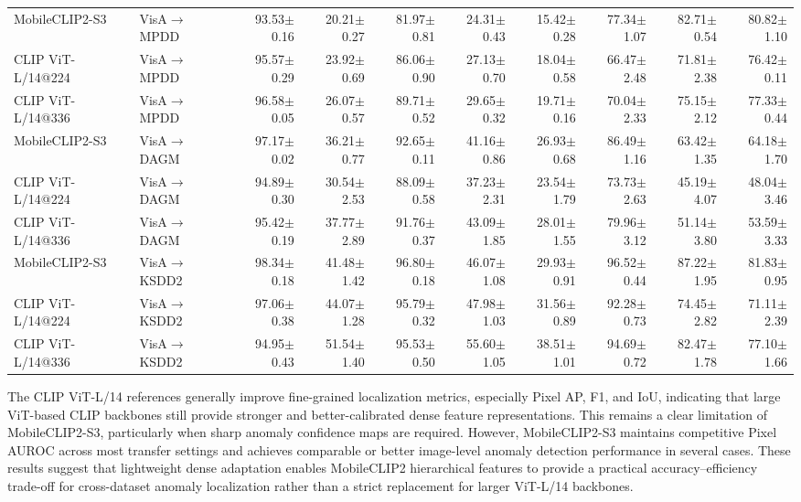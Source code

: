 \documentclass[10pt]{article}
\begin{document}
\begin{table}[htbp]
{\begin{tabular}{llrrrrrrrr}
\midrule
MobileCLIP2-S3 & VisA$\rightarrow$MPDD & 93.53$\pm$0.16 & 20.21$\pm$0.27 & 81.97$\pm$0.81 & 24.31$\pm$0.43 & 15.42$\pm$0.28 & 77.34$\pm$1.07 & 82.71$\pm$0.54 & 80.82$\pm$1.10 \\
CLIP ViT-L/14@224 & VisA$\rightarrow$MPDD & 95.57$\pm$0.29 & 23.92$\pm$0.69 & 86.06$\pm$0.90 & 27.13$\pm$0.70 & 18.04$\pm$0.58 & 66.47$\pm$2.48 & 71.81$\pm$2.38 & 76.42$\pm$0.11 \\
CLIP ViT-L/14@336 & VisA$\rightarrow$MPDD & 96.58$\pm$0.05 & 26.07$\pm$0.57 & 89.71$\pm$0.52 & 29.65$\pm$0.32 & 19.71$\pm$0.16 & 70.04$\pm$2.33 & 75.15$\pm$2.12 & 77.33$\pm$0.44 \\
\midrule
MobileCLIP2-S3 & VisA$\rightarrow$DAGM & 97.17$\pm$0.02 & 36.21$\pm$0.77 & 92.65$\pm$0.11 & 41.16$\pm$0.86 & 26.93$\pm$0.68 & 86.49$\pm$1.16 & 63.42$\pm$1.35 & 64.18$\pm$1.70 \\
CLIP ViT-L/14@224 & VisA$\rightarrow$DAGM & 94.89$\pm$0.30 & 30.54$\pm$2.53 & 88.09$\pm$0.58 & 37.23$\pm$2.31 & 23.54$\pm$1.79 & 73.73$\pm$2.63 & 45.19$\pm$4.07 & 48.04$\pm$3.46 \\
CLIP ViT-L/14@336 & VisA$\rightarrow$DAGM & 95.42$\pm$0.19 & 37.77$\pm$2.89 & 91.76$\pm$0.37 & 43.09$\pm$1.85 & 28.01$\pm$1.55 & 79.96$\pm$3.12 & 51.14$\pm$3.80 & 53.59$\pm$3.33 \\
\midrule
MobileCLIP2-S3 & VisA$\rightarrow$KSDD2 & 98.34$\pm$0.18 & 41.48$\pm$1.42 & 96.80$\pm$0.18 & 46.07$\pm$1.08 & 29.93$\pm$0.91 & 96.52$\pm$0.44 & 87.22$\pm$1.95 & 81.83$\pm$0.95 \\
CLIP ViT-L/14@224 & VisA$\rightarrow$KSDD2 & 97.06$\pm$0.38 & 44.07$\pm$1.28 & 95.79$\pm$0.32 & 47.98$\pm$1.03 & 31.56$\pm$0.89 & 92.28$\pm$0.73 & 74.45$\pm$2.82 & 71.11$\pm$2.39 \\
CLIP ViT-L/14@336 & VisA$\rightarrow$KSDD2 & 94.95$\pm$0.43 & 51.54$\pm$1.40 & 95.53$\pm$0.50 & 55.60$\pm$1.05 & 38.51$\pm$1.01 & 94.69$\pm$0.72 & 82.47$\pm$1.78 & 77.10$\pm$1.66 \\
\bottomrule
\end{tabular}
}
\end{table}

The CLIP ViT-L/14 references generally improve fine-grained localization metrics, especially Pixel AP, F1, and IoU, indicating that large ViT-based CLIP backbones still provide stronger and better-calibrated dense feature representations. This remains a clear limitation of MobileCLIP2-S3, particularly when sharp anomaly confidence maps are required. However, MobileCLIP2-S3 maintains competitive Pixel AUROC across most transfer settings and achieves comparable or better image-level anomaly detection performance in several cases. These results suggest that lightweight dense adaptation enables MobileCLIP2 hierarchical features to provide a practical accuracy--efficiency trade-off for cross-dataset anomaly localization rather than a strict replacement for larger ViT-L/14 backbones.
\end{document}
